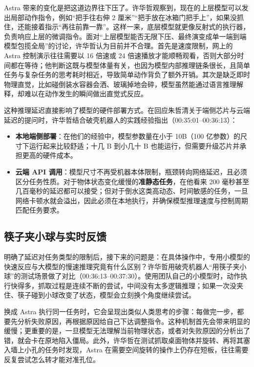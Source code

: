 \documentclass[UTF8,a4paper,11pt,fontset=fandol]{ctexart}
\begin{document}
Astra 带来的变化是把这道边界往下压了。许华哲观察到，现在的上层模型可以发出局部动作指令，例如“把手往右伸 2 厘米”“把手放在冰箱门把手上”，如果没抓住，还能接着指示“再往前靠一靠”。这样一来，底层模型就更像反射式的执行器，负责响应上层的微调指令。面对“上层模型能否无限下压、最终演变成单一端到端模型包揽全局”的讨论，许华哲认为目前并不合理。首先是速度限制，网上的 Astra 控制演示往往需要以 16 倍速或 24 倍速播放才能顺畅观看，否则大部分时间都在等待；他判断这既与模型体量有关，也因为模型内部推理链条很长，且简单任务与复杂任务的思考耗时相近，导致简单动作背负了额外开销。其次是缺乏即时物理直觉，比如碰倒装水容器会洒、玻璃掉地会碎，模型虽然能通过语言推理解释，却难以在动作发生的瞬间做出直觉式反应。

这种推理延迟直接影响了模型的硬件部署方式。在回应朱哲清关于端侧芯片与云端延迟的提问时，许华哲结合破壳机器人的实践经验指出（00:35:01–00:36:13）：
\begin{itemize}
\item \textbf{本地端侧部署}：在他们的经验中，模型参数量在小于 10B（100 亿参数）的尺寸下运行起来比较舒适；十几 B 到小几十 B 也能运行，但需要升级芯片并承担更高的硬件成本。
\item \textbf{云端 API 调用}：模型尺寸不再受机器本体限制，瓶颈转向网络延迟，且必须区分任务性质。对于物体状态变化缓慢的\textbf{准静态任务}，在他看来 200 毫秒甚至几百毫秒的延迟都可以接受；但对于倒水这类高动态、时间敏感的任务，一旦网络卡顿水就会溢出，因此必须在本地执行，并确保模型推理速度与控制周期匹配任务要求。
\end{itemize}

\subsection{筷子夹小球与实时反馈}
明确了延迟对任务类型的限制后，接下来的问题是：在具体操作中，专用小模型的快速反应与大模型的慢速推理究竟有什么区别？许华哲用破壳机器人“用筷子夹小球”的测试场景做了对比（00:36:13–00:37:30）。使用团队自己的小模型时，动作执行快得多，抓取过程是连续不断的尝试，中间没有太多逻辑推理；如果一次没夹住、筷子碰到小球改变了状态，模型会立刻换个角度继续尝试。

换成 Astra 执行同一任务时，它会呈现出类似人类思考的步骤：每做完一步，都要先分析失败原因，再根据原因给自己下达调整指令。这种机制首先会带来明显的缓慢；更重要的是，一旦模型无法理解当前物理状态，或者对失败原因的分析出了错，就会卡在原地陷入僵局。此外，许华哲在测试抓取桌面物体并旋转、再将其塞入墙上小孔的任务时发现，Astra 在需要空间旋转的操作上仍存在短板，往往需要反复尝试怎么转才能对准孔位。
\end{document}
